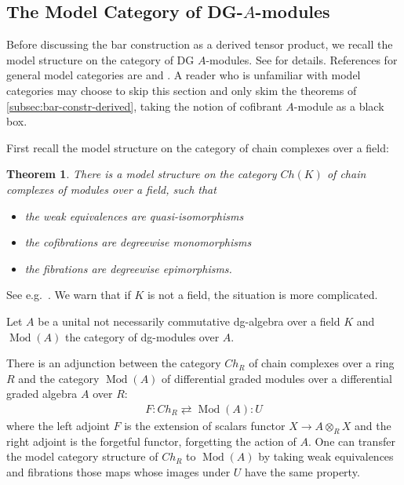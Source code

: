 \documentclass{scrartcl}
\theoremstyle{plain}
\newtheorem{theorem}{Theorem}[section]
\theoremstyle{definition}
\newtheorem{definition}[theorem]{Definition}
\DeclareMathOperator{\Mod}{Mod}
\begin{document}
\subsection{The Model Category of DG-$A$-modules} \label{subsec:model-dg-mod}
Before discussing the bar construction as a derived tensor product, we recall the model structure on the category of DG $A$-modules. See \cite{barthel2013six} for details. References for general model categories are \cite{hovey2007model} and \cite{hirschhorn2003model}. A reader who is unfamiliar with model categories may choose to skip this section and only skim the theorems of \cref{subsec:bar-constr-derived}, taking the notion of cofibrant $A$-module as a black box. 

First recall the model structure on the category of chain complexes over a field: 
\begin{theorem}
    There is a model structure on the category $Ch(K)$ of chain complexes of modules over a field, such that
    \begin{itemize}
        \item the weak equivalences are quasi-isomorphisms
        \item the cofibrations are degreewise monomorphisms
        \item the fibrations are degreewise epimorphisms.
    \end{itemize}
\end{theorem}
See e.g.~\cite{barthel2013six}. We warn that if $K$ is not a field, the situation is more complicated. 

Let $A$ be a unital not necessarily commutative dg-algebra over a field $K$ and $\Mod(A)$ the category of dg-modules over $A$. 

There is an adjunction between the category $Ch_R$ of chain complexes over a ring $R$ and the category $\Mod(A)$ of differential graded modules over a differential graded algebra $A$ over $R$:
\begin{align}
    F\colon Ch_R\rightleftarrows \Mod(A) \colon U \label{eq:adj-ch-mod-A}
\end{align}
where the left adjoint $F$ is the extension of scalars functor $X\to A\otimes_R X$ and the right adjoint is the forgetful functor, forgetting the action of $A$. One can transfer the model category structure of $Ch_R$ to $\Mod(A)$ by taking weak equivalences and fibrations those maps whose images under $U$ have the same property.

\end{document}

